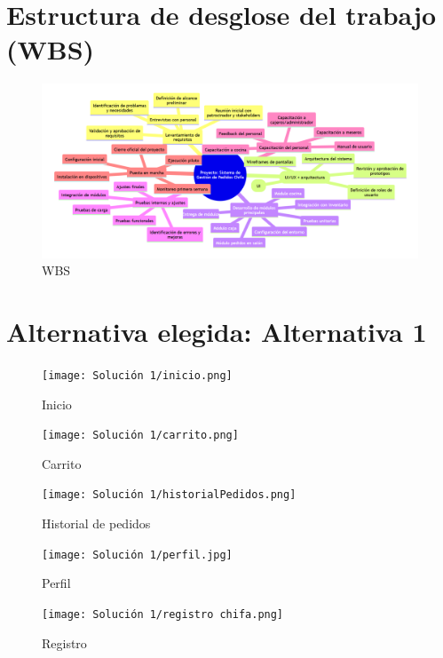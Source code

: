 \documentclass{article}
\begin{document}
\begin{doublespace}
\section{Estructura de desglose del trabajo (WBS)}

    \begin{figure}[H]
        \centering
        \vspace*{1cm}
        \includegraphics[width=14cm]{Gantt, WBS, Project Charter, BPM/WBS.png}
        \caption{WBS}
        \label{fig:WBS}
    \end{figure}

\section{Alternativa elegida: Alternativa 1}

    \begin{figure}[H]
        \centering
        \vspace*{1cm}
        \texttt{[image: Solución 1/inicio.png]}
        \caption{Inicio}
        \label{fig:Inicio}
    \end{figure}
    \begin{figure}[H]
        \centering
        \vspace*{1cm}
        \texttt{[image: Solución 1/carrito.png]}
        \caption{Carrito}
        \label{fig:Carrito}
    \end{figure}
    \begin{figure}[H]
        \centering
        \vspace*{1cm}
        \texttt{[image: Solución 1/historialPedidos.png]}
        \caption{Historial de pedidos}
        \label{fig:Historial-Pedidos}
    \end{figure}
    \begin{figure}[H]
        \centering
        \vspace*{1cm}
        \texttt{[image: Solución 1/perfil.jpg]}
        \caption{Perfil}
        \label{fig:Perfil}
    \end{figure}
    \begin{figure}[H]
        \centering
        \vspace*{1cm}
        \texttt{[image: Solución 1/registro chifa.png]}
        \caption{Registro}
        \label{fig:Registro}
    \end{figure}


\end{doublespace}
\end{document}
